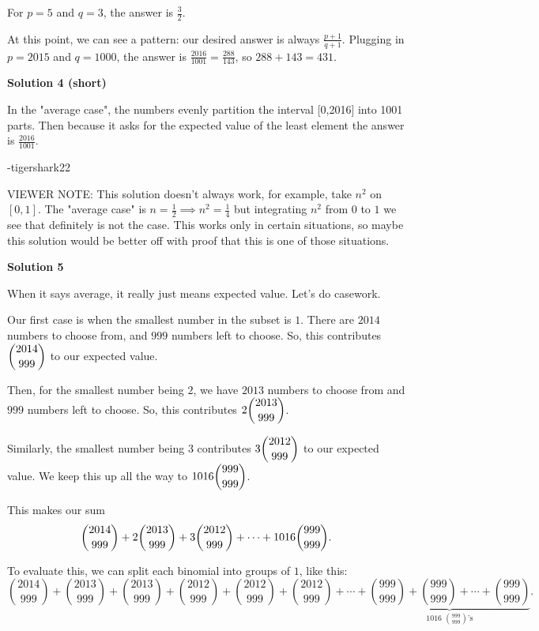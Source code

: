 \begin{enumerate}
 For $p = 5$ and $q = 3$, the answer is $\frac32$.

 At this point, we can see a pattern: our desired answer is always $\frac{p+1}{q+1}$. Plugging in $p = 2015$ and $q = 1000$, the answer is $\frac{2016}{1001}=\frac{288}{143}$, so $288 + 143 = \boxed{431}$.

 



\textbf{Solution 4 (short)}

In the "average case", the numbers evenly partition the interval [0,2016] into 1001 parts. Then because it asks for the expected value of the least element the answer is $\frac{2016}{1001}$.

 -tigershark22

 VIEWER NOTE: This solution doesn't always work, for example, take $n^2$ on $[0,1]$. The "average case" is $n=\frac{1}{2}\implies n^2=\frac{1}{4}$ but integrating $n^2$ from $0$ to $1$ we see that definitely is not the case. This works only in certain situations, so maybe this solution would be better off with proof that this is one of those situations.

 



\textbf{Solution 5}

When it says average, it really just means expected value. Let's do casework.

 Our first case is when the smallest number in the subset is $1$. There are $2014$ numbers to choose from, and $999$ numbers left to choose. So, this contributes $\dbinom{2014}{999}$ to our expected value.

 Then, for the smallest number being $2$, we have $2013$ numbers to choose from and $999$ numbers left to choose. So, this contributes $2\dbinom{2013}{999}$.

 Similarly, the smallest number being $3$ contributes $3\dbinom{2012}{999}$ to our expected value. We keep this up all the way to $1016\dbinom{999}{999}$.

 This makes our sum
 \[\dbinom{2014}{999} + 2\dbinom{2013}{999} + 3\dbinom{2012}{999} + \cdots + 1016\dbinom{999}{999}.\]

 To evaluate this, we can split each binomial into groups of $1$, like this:
 \[\binom{2014}{999} + \binom{2013}{999} + \binom{2013}{999} + \binom{2012}{999} + \binom{2012}{999} + \binom{2012}{999} + \cdots + \underbrace{\binom{999}{999} + \binom{999}{999} + \cdots + \binom{999}{999}}_{\text{1016 }\binom{999}{999}\text{'s}}.\]


\end{enumerate}
